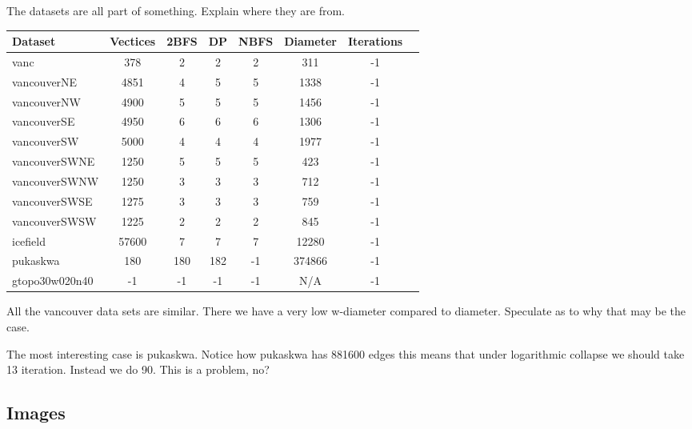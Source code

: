 The datasets are all part of something. Explain where they are from.


\begin{center}
\begin{tabular}{l*{6}{c}r}
Dataset             & Vectices  & 2BFS  & DP    & NBFS  & Diameter  & Iterations\\
\hline
vanc                & 378       & 2     & 2     & 2     & 311       & -1 \\
vancouverNE         & 4851      & 4     & 5     & 5     & 1338      & -1 \\
vancouverNW         & 4900      & 5     & 5     & 5     & 1456      & -1 \\
vancouverSE         & 4950      & 6     & 6     & 6     & 1306      & -1 \\
vancouverSW         & 5000      & 4     & 4     & 4     & 1977      & -1 \\
vancouverSWNE       & 1250      & 5     & 5     & 5     & 423       & -1 \\
vancouverSWNW       & 1250      & 3     & 3     & 3     & 712       & -1 \\
vancouverSWSE       & 1275      & 3     & 3     & 3     & 759       & -1 \\
vancouverSWSW       & 1225      & 2     & 2     & 2     & 845       & -1 \\
icefield            & 57600     & 7     & 7     & 7     & 12280     & -1 \\
pukaskwa            & 180       & 180   & 182   & -1    & 374866    & -1 \\
gtopo30w020n40      & -1        & -1    & -1    & -1    & N/A       & -1 \\

\end{tabular}
\end{center}

All the vancouver data sets are similar. There we have a very low w-diameter compared to diameter. Speculate as to why that may be the case.

The most interesting case is pukaskwa. Notice how pukaskwa has 881600 edges this means that under logarithmic collapse we should take 13 iteration. Instead we do 90. This is a problem, no?

\subsection{Images}

